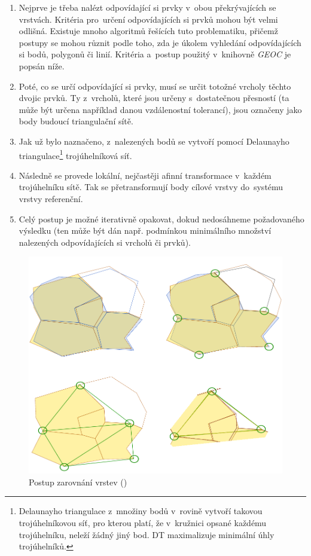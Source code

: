 \begin{enumerate}
 \item Nejprve je třeba nalézt odpovídající si prvky v~obou překrývajících se 
    vrstvách. Kritéria pro~určení odpovídajících si prvků mohou být velmi 
    odlišná. Existuje mnoho algoritmů řešících tuto problematiku, přičemž 
    postupy se mohou různit podle toho, zda je úkolem vyhledání 
    odpovídajících si bodů, polygonů či linií. Kritéria a~postup použitý 
    v~knihovně \textit{GEOC} je popsán níže.
 \item Poté, co se určí odpovídající si prvky, musí se určit totožné vrcholy 
    těchto dvojic prvků. Ty z~vrcholů, které jsou určeny s~dostatečnou 
    přesností (ta může být určena například danou vzdálenostní tolerancí), 
    jsou označeny jako body budoucí triangulační sítě.
 \item Jak už bylo naznačeno, z~nalezených bodů se vytvoří pomocí Delaunayho 
    triangulace\footnote{Delaunayho triangulace z~množiny bodů v~rovině vytvoří takovou 
    trojúhelníkovou síť, pro kterou platí, že v~kružnici opsané každému
    trojúhelníku, neleží žádný jiný bod. DT maximalizuje
    minimální úhly trojúhelníků.} trojúhelníková síť. 
 \item Následně se provede lokální, nejčastěji afinní transformace v~každém 
    trojúhelníku sítě. Tak se přetransformují body cílové vrstvy do~systému 
    vrstvy referenční.
 \item Celý postup je možné iterativně opakovat, dokud nedosáhneme 
    požadovaného výsledku (ten může být dán např. podmínkou minimálního 
    množství nalezených odpovídajících si vrcholů či prvků).
\end{enumerate}

\label{capic}
  \begin{figure}[hbt]
    \centering
      \includegraphics[width=400pt]{./pictures/ca-princip.pdf}
      \caption{Postup zarovnání vrstev ()}
      \label{fig:ca-princip}
  \end{figure}

